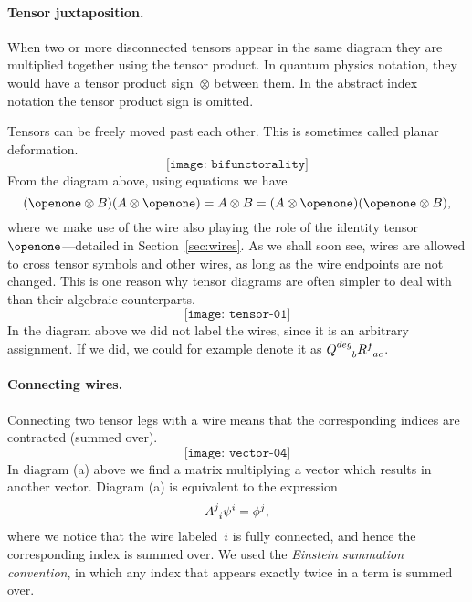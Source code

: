 \documentclass[aps,pra,12pt,nofootinbib,superscriptaddress,longbibliography]{revtex4-1}
\theoremstyle{plain}
\theoremstyle{definition}
\newcommand{\I}{\openone}     %
\newcommand{\be}{\begin{equation}}
\newcommand{\ee}{\end{equation}}
\begin{document}
\paragraph{{\bf Tensor juxtaposition.}}

When two or more disconnected tensors appear in the same diagram they are multiplied
together using the tensor product.
In quantum physics notation, they would have a tensor
product sign~$\otimes$ between them.
In the abstract index notation the tensor product sign is omitted.

Tensors
can be freely moved past each other.  This is sometimes called planar deformation.
\be
 \texttt{[image: bifunctorality]}
\ee
From the diagram above, using equations we have 
\begin{equation}
 (\I\otimes B)(A\otimes \I) = A\otimes B = (A\otimes \I)(\I\otimes B),
\end{equation}
where we make use of the wire also playing the role of the identity tensor~$\I$---detailed in Section~\ref{sec:wires}.
As we shall soon see, wires
are allowed to cross tensor symbols and other wires,
as long as the wire endpoints are not changed.
This is one reason why tensor diagrams are often
simpler to deal with
than their algebraic counterparts.
\be
 \texttt{[image: tensor-01]}
\ee
In the diagram above we did not label the wires, since
it is an arbitrary assignment. If we did, we could for example denote it as
$Q\indices{^{deg}_{b}}R\indices{^{f}_{ac}}$.



\paragraph{{\bf Connecting wires.}}


Connecting two tensor legs with a wire means that the
corresponding indices are contracted (summed over).
\be
 \texttt{[image: vector-04]}
\ee
In diagram (a) above  we find a matrix multiplying a vector
which results in another vector.
Diagram (a) is equivalent to the expression
\begin{equation}
  A\indices{^j_i} \psi^i = \phi^j,
\end{equation}
where we notice that the wire labeled~$i$ is fully connected, and
hence the corresponding index is summed over.
We used the \emph{Einstein summation convention},
in which any index that appears exactly twice in a term is summed over.
\end{document}
